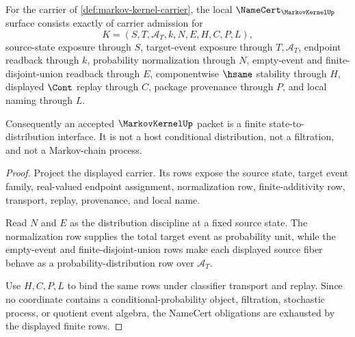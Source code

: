 \begin{theorem}
\label{thm:markov-kernel-namecert-obligations}
For the carrier of \autoref{def:markov-kernel-carrier}, the local $\NameCert_{\MarkovKernelUp}$ surface consists exactly of carrier admission for
$$
K=(S,T,\mathcal{A}_T,k,N,E,H,C,P,L),
$$
source-state exposure through $S$, target-event exposure through $T,\mathcal{A}_T$, endpoint readback through $k$, probability normalization through $N$, empty-event and finite-disjoint-union readback through $E$, componentwise $\hsame$ stability through $H$, displayed $\Cont$ replay through $C$, package provenance through $P$, and local naming through $L$.

Consequently an accepted $\MarkovKernelUp$ packet is a finite state-to-distribution interface. It is not a host conditional distribution, not a filtration, and not a Markov-chain process.
\end{theorem}
\begin{proof}
Project the displayed carrier. Its rows expose the source state, target event family, real-valued endpoint assignment, normalization row, finite-additivity row, transport, replay, provenance, and local name.

Read $N$ and $E$ as the distribution discipline at a fixed source state. The normalization row supplies the total target event as probability unit, while the empty-event and finite-disjoint-union rows make each displayed source fiber behave as a probability-distribution row over $\mathcal{A}_T$.

Use $H,C,P,L$ to bind the same rows under classifier transport and replay. Since no coordinate contains a conditional-probability object, filtration, stochastic process, or quotient event algebra, the NameCert obligations are exhausted by the displayed finite rows.
\end{proof}

